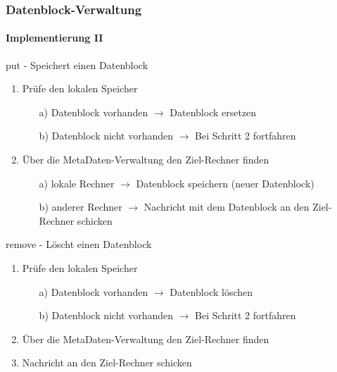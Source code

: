 \documentclass{beamer}
\begin{document}
		\begin{frame}
			\frametitle{Datenblock-Verwaltung}
			\framesubtitle{Implementierung II}

			\begin{block}{put - Speichert einen Datenblock}
				\begin{enumerate}
					\item Prüfe den lokalen Speicher
						\begin{enumerate}
							\item[a)] Datenblock vorhanden $\rightarrow$ Datenblock ersetzen
							\item[b)] Datenblock nicht vorhanden $\rightarrow$ Bei Schritt 2 fortfahren
						\end{enumerate}
					\item Über die MetaDaten-Verwaltung den Ziel-Rechner finden
						\begin{enumerate}
							\item[a)] lokale Rechner $\rightarrow$ Datenblock speichern (neuer Datenblock)
							\item[b)] anderer Rechner $\rightarrow$ Nachricht mit dem Datenblock an den Ziel-Rechner schicken
						\end{enumerate}
				\end{enumerate}
			\end{block}

			\begin{block}{remove - Löscht einen Datenblock}
				\begin{enumerate}
					\item Prüfe den lokalen Speicher
						\begin{enumerate}
							\item[a)] Datenblock vorhanden $\rightarrow$ Datenblock löschen
							\item[b)] Datenblock nicht vorhanden $\rightarrow$ Bei Schritt 2 fortfahren
						\end{enumerate}
					\item Über die MetaDaten-Verwaltung den Ziel-Rechner finden
					\item Nachricht an den Ziel-Rechner schicken
				\end{enumerate}
			\end{block}
		\end{frame}
\end{document}
